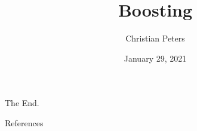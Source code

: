 \documentclass[10pt]{beamer}
\title{Boosting}
\date{January 29, 2021}
\author{Christian Peters}
\begin{document}
\maketitle





	




\begin{frame}[standout]
  The End.
\end{frame}

\appendix

\begin{frame}[allowframebreaks]{References}

  \nocite{SSBD14, FREUND1997119, kv-lbffahf-88}

  
  

\end{frame}
\end{document}
